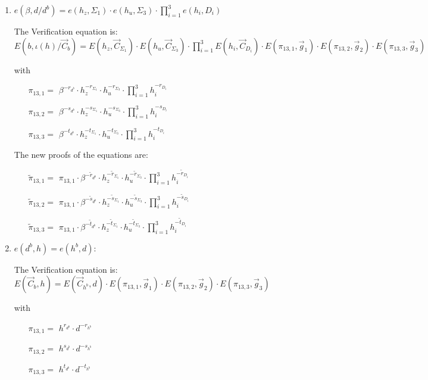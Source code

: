 \begin{description}
\begin{enumerate}
  \item $e(\beta, d/\boxed{d^b}) = e(h_z, \boxed{\Sigma_1}) \cdot e(h_u, \boxed{\Sigma_3}) \cdot \prod_{i=1}^3 e(h_i, \boxed{D_i})$

    The Verification equation is: $E(b, \iota(h)/\vec{C}_{b}) = E(h_z, \vec{C}_{\Sigma_1}) \cdot E(h_u, \vec{C}_{\Sigma_3}) \cdot \prod_{i=1}^3 E(h_i, \vec{C}_{D_i}) \cdot E(\pi_{13,1}, \vec{g}_1)\cdot E(\pi_{13,2}, \vec{g}_2)\cdot E(\pi_{13,3}, \vec{g}_3)$

    with
    \begin{itemize}
    \item[$\pi_{13,1} = $] $\beta^{-r_{d^b}} \cdot h_z^{-r_{\Sigma_1}} \cdot h_u^{-r_{\Sigma_3}} \cdot \prod_{i=1}^3 h_i^{-r_{D_i}}$
    \item[$\pi_{13,2} = $] $\beta^{-s_{d^b}} \cdot h_z^{-s_{\Sigma_1}} \cdot h_u^{-s_{\Sigma_3}} \cdot \prod_{i=1}^3 h_i^{-s_{D_i}}$
    \item[$\pi_{13,3} = $] $\beta^{-t_{d^b}} \cdot h_z^{-t_{\Sigma_1}} \cdot h_u^{-t_{\Sigma_3}} \cdot \prod_{i=1}^3 h_i^{-t_{D_i}}$
    \end{itemize}

    The new proofs of the equations are:
    \begin{itemize}
    \item[$\tilde{\pi}_{13,1} = $] $\pi_{13,1} \cdot \beta^{-\tilde{r}_{d^b}} \cdot h_z^{-\tilde{r}_{\Sigma_1}} \cdot h_u^{-\tilde{r}_{\Sigma_3}} \cdot \prod_{i=1}^3 h_i^{-\tilde{r}_{D_i}}$
    \item[$\tilde{\pi}_{13,2} = $] $\pi_{13,1} \cdot \beta^{-\tilde{s}_{d^b}} \cdot h_z^{-\tilde{s}_{\Sigma_1}} \cdot h_u^{-\tilde{s}_{\Sigma_3}} \cdot \prod_{i=1}^3 h_i^{-\tilde{s}_{D_i}}$
    \item[$\tilde{\pi}_{13,3} = $] $\pi_{13,1} \cdot \beta^{-\tilde{t}_{d^b}} \cdot h_z^{-\tilde{t}_{\Sigma_1}} \cdot h_u^{-\tilde{t}_{\Sigma_3}} \cdot \prod_{i=1}^3 h_i^{-\tilde{t}_{D_i}}$
    \end{itemize}

  \item \label{relationhd}
    $e(\boxed{d^b},h) = e(\boxed{h^b}, d)$: 

    The Verification equation is: $E(\vec{C}_b, h) = E(\vec{C}_{h^b}, d) \cdot E(\pi_{13,1}, \vec{g}_1)\cdot E(\pi_{13,2}, \vec{g}_2)\cdot E(\pi_{13,3}, \vec{g}_3)$

    with
    \begin{itemize}
    \item[$\pi_{13,1} = $] $h^{r_{d^b}} \cdot d^{-r_{h^b}}$
    \item[$\pi_{13,2} = $] $h^{s_{d^b}} \cdot d^{-s_{h^b}}$
    \item[$\pi_{13,3} = $] $h^{t_{d^b}} \cdot d^{-t_{h^b}}$
    \end{itemize}


\end{enumerate}
\end{description}
